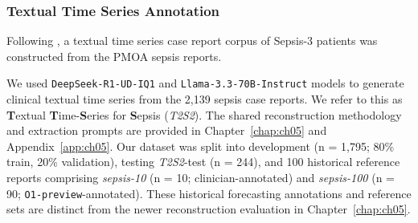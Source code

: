 \subsubsection{Textual Time Series Annotation}
\label{ch07:sec:tts-annotation}

Following \citet{ch07:noroozizadeh2025reconstructing}, a textual time series case report corpus of Sepsis-3 patients was constructed from the PMOA sepsis reports.

We used \texttt{DeepSeek-R1-UD-IQ1} and \texttt{Llama-3.3-70B-Instruct} models to generate clinical textual time series from the 2,139 sepsis case reports.
We refer to this as \textbf{T}extual \textbf{T}ime-\textbf{S}eries for \textbf{S}epsis (\textit{T2S2}).
The shared reconstruction methodology and extraction prompts are provided in Chapter~\ref{chap:ch05} and Appendix~\ref{app:ch05}.
Our dataset was split into development (n = 1,795; 80\% train, 20\% validation), testing \textit{T2S2}-test (n = 244), and 100 historical reference reports comprising \textit{sepsis-10} (n = 10; clinician-annotated) and \textit{sepsis-100} (n = 90; \texttt{O1-preview}-annotated).
These historical forecasting annotations and reference sets are distinct from the newer reconstruction evaluation in Chapter~\ref{chap:ch05}.
\par
